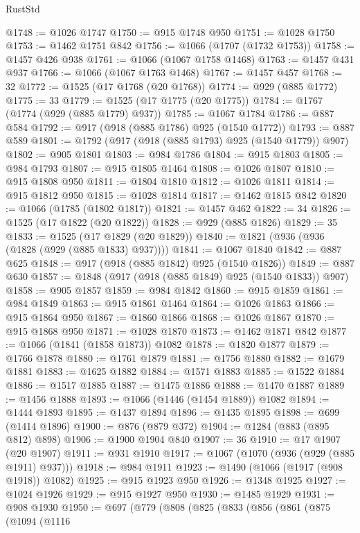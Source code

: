 \begin{lexlean}{RustStd}
\begin{coremodule}
@1748 := @1026 @1747
@1750 := @915 @1748 @950
@1751 := @1028 @1750
@1753 := @1462 @1751 @842
@1756 := @1066 (@1707 (@1732 @1753))
@1758 := @1457 @426 @938
@1761 := @1066 (@1067 @1758 @1468)
@1763 := @1457 @431 @937
@1766 := @1066 (@1067 @1763 @1468)
@1767 := @1457 @457
@1768 := 32
@1772 := @1525 (@17 @1768 (@20 @1768))
@1774 := @929 (@885 @1772)
@1775 := 33
@1779 := @1525 (@17 @1775 (@20 @1775))
@1784 := @1767 (@1774 (@929 (@885 @1779) @937))
@1785 := @1067 @1784
@1786 := @887 @584
@1792 := @917 (@918 (@885 @1786) @925 (@1540 @1772))
@1793 := @887 @589
@1801 := @1792 (@917 (@918 (@885 @1793) @925 (@1540 @1779)) @907)
@1802 := @905 @1801
@1803 := @984 @1786
@1804 := @915 @1803
@1805 := @984 @1793
@1807 := @915 @1805 @1464
@1808 := @1026 @1807
@1810 := @915 @1808 @950
@1811 := @1804 @1810
@1812 := @1026 @1811
@1814 := @915 @1812 @950
@1815 := @1028 @1814
@1817 := @1462 @1815 @842
@1820 := @1066 (@1785 (@1802 @1817))
@1821 := @1457 @462
@1822 := 34
@1826 := @1525 (@17 @1822 (@20 @1822))
@1828 := @929 (@885 @1826)
@1829 := 35
@1833 := @1525 (@17 @1829 (@20 @1829))
@1840 := @1821 (@936 (@936 (@1828 (@929 (@885 @1833) @937))))
@1841 := @1067 @1840
@1842 := @887 @625
@1848 := @917 (@918 (@885 @1842) @925 (@1540 @1826))
@1849 := @887 @630
@1857 := @1848 (@917 (@918 (@885 @1849) @925 (@1540 @1833)) @907)
@1858 := @905 @1857
@1859 := @984 @1842
@1860 := @915 @1859
@1861 := @984 @1849
@1863 := @915 @1861 @1464
@1864 := @1026 @1863
@1866 := @915 @1864 @950
@1867 := @1860 @1866
@1868 := @1026 @1867
@1870 := @915 @1868 @950
@1871 := @1028 @1870
@1873 := @1462 @1871 @842
@1877 := @1066 (@1841 (@1858 @1873)) @1082
@1878 := @1820 @1877
@1879 := @1766 @1878
@1880 := @1761 @1879
@1881 := @1756 @1880
@1882 := @1679 @1881
@1883 := @1625 @1882
@1884 := @1571 @1883
@1885 := @1522 @1884
@1886 := @1517 @1885
@1887 := @1475 @1886
@1888 := @1470 @1887
@1889 := @1456 @1888
@1893 := @1066 (@1446 (@1454 @1889)) @1082
@1894 := @1444 @1893
@1895 := @1437 @1894
@1896 := @1435 @1895
@1898 := @699 (@1414 @1896)
@1900 := @876 (@879 @372)
@1904 := @1284 (@883 (@895 @812) @898)
@1906 := @1900 @1904 @840
@1907 := 36
@1910 := @17 @1907 (@20 @1907)
@1911 := @931 @1910
@1917 := @1067 (@1070 (@936 (@929 (@885 @1911) @937)))
@1918 := @984 @1911
@1923 := @1490 (@1066 (@1917 (@908 @1918)) @1082)
@1925 := @915 @1923 @950
@1926 := @1348 @1925
@1927 := @1024 @1926
@1929 := @915 @1927 @950
@1930 := @1485 @1929
@1931 := @908 @1930
@1950 := @697
    (@779
      (@808
        (@825
          (@833
            (@856
              (@861
                (@875
                  (@1094
                    (@1116

\end{coremodule}
\end{lexlean}
